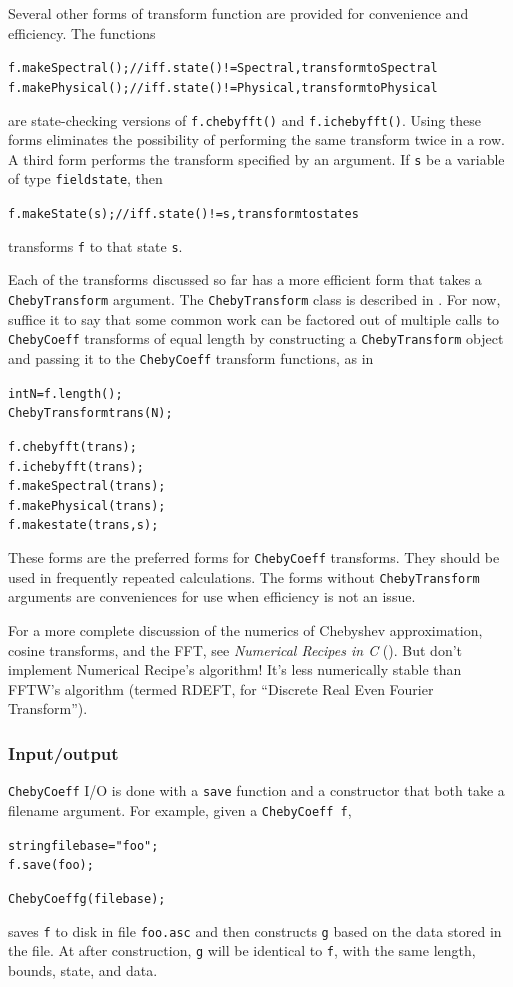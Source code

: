 \documentclass{article}[12pt]
\begin{document}
Several other forms of transform function are provided for convenience
and efficiency. The functions
\begin{alltt}
    f.makeSpectral();  // if f.state()!=Spectral, transform to Spectral
    f.makePhysical();  // if f.state()!=Physical, transform to Physical
\end{alltt}
are state-checking versions of {\tt f.chebyfft()} and {\tt f.ichebyfft()}.
Using these forms eliminates the possibility of performing the same
transform twice in a row. A third form performs the transform specified
by an argument. If {\tt s} be a variable of type {\tt fieldstate}, then
\begin{alltt}
    f.makeState(s);  // if f.state()!=s, transform to state s
\end{alltt}
transforms {\tt f} to that state {\tt s}.

Each of the transforms discussed so far has a more efficient form
that takes a {\tt ChebyTransform} argument. The {\tt ChebyTransform}
class is described in . For now, suffice it to
say that some common work can be factored out of multiple calls to
{\tt ChebyCoeff} transforms of equal length by constructing a
{\tt ChebyTransform} object and passing it to the {\tt ChebyCoeff}
transform functions, as in
\begin{alltt}
    int N = f.length();
    ChebyTransform trans(N);

    f.chebyfft(trans);
    f.ichebyfft(trans);
    f.makeSpectral(trans);
    f.makePhysical(trans);
    f.makestate(trans, s);
\end{alltt}
These forms are the preferred forms for {\tt ChebyCoeff} transforms.
They should be used in frequently repeated calculations. The forms without
{\tt ChebyTransform} arguments are conveniences for use when efficiency
is not an issue.

For a more complete discussion of the numerics of Chebyshev approximation,
cosine transforms, and the FFT, see {\em Numerical Recipes in C}
(\cite{Press88}). But don't implement Numerical Recipe's algorithm! It's
less numerically stable than FFTW's algorithm (termed RDEFT, for
``Discrete Real Even Fourier Transform'').

\subsubsection{Input/output}

{\tt ChebyCoeff} I/O is done with a {\tt save} function and a constructor
that both take a filename argument. For example, given a {\tt ChebyCoeff f},
\begin{alltt}
  string filebase = "foo";
  f.save(foo);

  ChebyCoeff g(filebase);
\end{alltt}
saves {\tt f} to disk in file {\tt foo.asc} and then constructs {\tt g}
based on the data stored in the file. At after construction, {\tt g}
will be identical to {\tt f}, with the same length, bounds, state, and
data.
\end{document}
